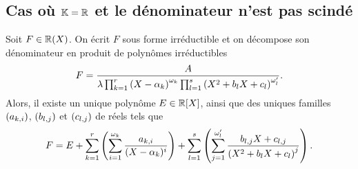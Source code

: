 \documentclass{magnolia}
\begin{document}



\subsection{Cas où $\mathbb{K}=\mathbb{R}$ et le dénominateur n'est pas scindé}

\begin{proposition}
Soit $F\in\fracR$. On écrit $F$ sous forme irréductible et on
décompose son dénominateur en produit de polynômes irréductibles
\[F=\frac{A}{\lambda \prod_{k=1}^r \left(X-\alpha_k\right)^{\omega_k}
    \prod_{l=1}^s \left(X^2+b_lX+c_l\right)^{\omega_l'}}.\]
Alors, il existe un unique polynôme $E\in\polyR$, ainsi que des uniques familles
$\left(a_{k,i}\right)$, $\left(b_{l,j}\right)$ et $\left(c_{l,j}\right)$ de réels tels que
\[F=E+\sum_{k=1}^r \left(\sum_{i=1}^{\omega_k} \frac{a_{k,i}}{(X-\alpha_k)^i}\right)
 +\sum_{l=1}^s \left(\sum_{j=1}^{\omega_l'} \frac{b_{l,j}X+c_{l,j}}{\left(X^2+b_lX+c_l\right)^j}\right).\]
\end{proposition}
\end{document}
